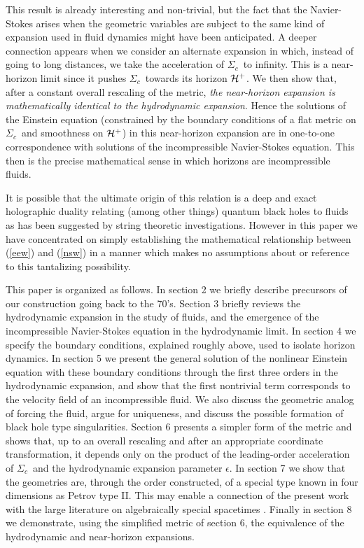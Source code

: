 \documentclass{article}
\def\e{{\epsilon}}
\def\sc{$\Sigma_c$}
\def\hp{${\cal H}^+$}
\begin{document}
This result is already interesting and non-trivial, but the fact that the Navier-Stokes arises when the
geometric variables are subject to the same kind of expansion used in fluid dynamics might have been anticipated. A deeper connection appears when we consider an alternate expansion in which, instead of going to long distances, we take the acceleration of \sc\ to infinity. This is a near-horizon limit since it pushes \sc\ towards its horizon \hp. We then show that, after a constant overall rescaling of the metric,  {\it the near-horizon expansion is mathematically identical to the hydrodynamic expansion}. Hence the solutions of the Einstein equation (constrained by the boundary conditions of a flat metric on \sc\ and smoothness on \hp) in this near-horizon expansion are in one-to-one correspondence with solutions of the incompressible Navier-Stokes equation. This then is the precise mathematical sense in which horizons are incompressible fluids.

It is possible that the ultimate origin of this relation is a deep and exact holographic duality relating (among other things) quantum black holes to fluids as has been suggested by string theoretic investigations. However in this paper we have concentrated on simply establishing the mathematical relationship between (\ref{eew}) and (\ref{nsw}) in a manner which makes no assumptions about or reference to this tantalizing possibility.



This paper is organized as follows. In section 2 we briefly describe precursors of our construction going back to the 70's.  Section 3 briefly reviews the hydrodynamic expansion in the study of fluids, and the emergence of the incompressible Navier-Stokes equation in the hydrodynamic limit. In section 4 we specify the boundary conditions, explained roughly above, used to isolate horizon dynamics. In section 5 we present the general solution of the nonlinear Einstein equation with these boundary conditions through the first three orders in the hydrodynamic expansion, and show that the first nontrivial term corresponds to the velocity field of an incompressible fluid. We also discuss the geometric analog of forcing the fluid, argue for uniqueness, and discuss the possible formation of black hole type singularities. Section 6 presents a simpler form of the metric and shows that, up to an overall rescaling and after an appropriate coordinate transformation,  it depends only on the product of the leading-order acceleration of \sc\ and the hydrodynamic expansion parameter $\e$. In section 7 we show that the geometries are, through the order constructed, of a special type known in four dimensions as Petrov type II. This may enable a connection of the present work with the large literature on algebraically special spacetimes \cite{petr, exac,Milson:2004jx}. Finally in section 8 we demonstrate, using the simplified metric of section 6, the equivalence of the hydrodynamic and near-horizon expansions.
\end{document}
